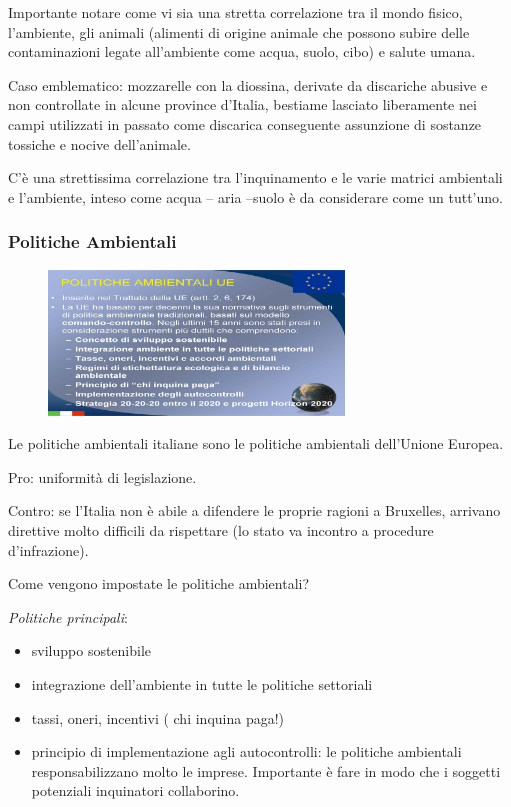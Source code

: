 Importante notare come vi sia una stretta correlazione tra il mondo
fisico, l'ambiente, gli animali (alimenti di origine animale che possono
subire delle contaminazioni legate all'ambiente come acqua, suolo, cibo)
e salute umana.

Caso emblematico: mozzarelle con la diossina, derivate da discariche
abusive e non controllate in alcune province d'Italia, bestiame lasciato
liberamente nei campi utilizzati in passato come discarica conseguente
assunzione di sostanze tossiche e nocive dell'animale.

C'è una strettissima correlazione tra l'inquinamento e le varie matrici
ambientali e l'ambiente, inteso come acqua -- aria --suolo è da
considerare come un tutt'uno.

\subsubsection{Politiche Ambientali}

\begin{figure}[!ht]
\centering
	\includegraphics[width=0.7\textwidth]{22/image2.jpeg}
	\end{figure}

Le politiche ambientali italiane sono le politiche ambientali
dell'Unione Europea.

Pro: uniformità di legislazione.

Contro: se l'Italia non è abile a difendere le proprie ragioni a
Bruxelles, arrivano direttive molto difficili da rispettare (lo stato va
incontro a procedure d'infrazione).

Come vengono impostate le politiche ambientali?

\emph{Politiche principali}:

\begin{itemize}
\item
  sviluppo sostenibile
\item
  integrazione dell'ambiente in tutte le politiche settoriali
\item
  tassi, oneri, incentivi ( chi inquina paga!)
\item
  principio di implementazione agli autocontrolli: le politiche
  ambientali responsabilizzano molto le imprese. Importante è fare in
  modo che i soggetti potenziali inquinatori collaborino.
\end{itemize}

